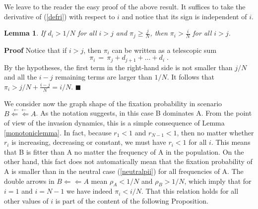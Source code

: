 \documentclass[12pt]{article}
\newtheorem{lemma}{Lemma}
\begin{document}
We leave to the reader the easy proof of the above result. It suffices to take the derivative of (\ref{defri}) with respect to $i$ and notice that its sign is independent of $i$.

\begin{lemma}  \label{telescopiclemma}
		If $d_i>1/N$ for all $i > j$ and $\pi_j \geq \frac{j}{N}$, then $\pi_i > \frac{i}{N}$ for all $i > j$.
\end{lemma}

\textbf{Proof}
	Notice that if $i>j$, then $\pi_i$ can be written as a telescopic sum
	\[ \pi_i \,=\, \pi_j+ d_{j+1}+ \dots + d_i \;. \]
	By the hypotheses, the first term in the right-hand side is not smaller than $j/N$ and all the $i-j$ remaining terms are larger than $1/N$. It follows that $\pi_i> j/N+\frac{i-j}{N} =i/N$. $\blacksquare$ 


We consider now the graph shape of the fixation probability in scenario $B\stackrel{\leftarrow \leftarrow}{\Leftarrow \Leftarrow} A$. As the notation suggests, in this case B dominates A. From the point of view of the invasion dynamics, this is a simple consequence of Lemma \ref{monotoniclemma}. In fact, because $r_1<1$ and $r_{N-1}<1$, then no matter whether $r_i$ is increasing, decreasing or constant, we must have $r_i<1$ for all $i$. This means that B is fitter than A no matter the frequency of A in the population. On the other hand, this fact does not automatically mean that the fixation probability of A is smaller than in the neutral case (\ref{neutralpii}) for all frequencies of A. The double arrows in $B\stackrel{}{\Leftarrow \Leftarrow} A$ mean $\rho_A<1/N$ and $\rho_B>1/N$, which imply that for $i=1$ and $i=N-1$ we have indeed $\pi_i<i/N$. That this relation holds for all other values of $i$ is part of the content of the following Proposition.
\end{document}
